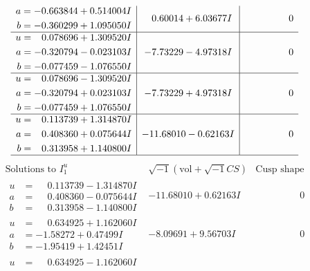 \documentclass[1p]{elsarticle_modified}
\theoremstyle{definition}
\newcommand{\I}{\sqrt{-1}}
\begin{document}
$$\begin{array}{c|c|c}
\begin{aligned}
a &= -0.663844 + 0.514004 I \\
b &= -0.360299 + 1.095050 I\end{aligned}
 & \phantom{-}0.60014 + 6.03677 I & \phantom{-0.000000 } 0 \\ \hline\begin{aligned}
u &= \phantom{-}0.078696 + 1.309520 I \\
a &= -0.320794 - 0.023103 I \\
b &= -0.077459 - 1.076550 I\end{aligned}
 & -7.73229 - 4.97318 I & \phantom{-0.000000 } 0 \\ \hline\begin{aligned}
u &= \phantom{-}0.078696 - 1.309520 I \\
a &= -0.320794 + 0.023103 I \\
b &= -0.077459 + 1.076550 I\end{aligned}
 & -7.73229 + 4.97318 I & \phantom{-0.000000 } 0 \\ \hline\begin{aligned}
u &= \phantom{-}0.113739 + 1.314870 I \\
a &= \phantom{-}0.408360 + 0.075644 I \\
b &= \phantom{-}0.313958 + 1.140800 I\end{aligned}
 & -11.68010 - 0.62163 I & \phantom{-0.000000 } 0\\
 \hline 
 \end{array}$$\newpage$$\begin{array}{c|c|c}  
\text{Solutions to }I^u_{1}& \I (\text{vol} + \sqrt{-1}CS) & \text{Cusp shape}\\
 \hline 
\begin{aligned}
u &= \phantom{-}0.113739 - 1.314870 I \\
a &= \phantom{-}0.408360 - 0.075644 I \\
b &= \phantom{-}0.313958 - 1.140800 I\end{aligned}
 & -11.68010 + 0.62163 I & \phantom{-0.000000 } 0 \\ \hline\begin{aligned}
u &= \phantom{-}0.634925 + 1.162060 I \\
a &= -1.58272 + 0.47499 I \\
b &= -1.95419 + 1.42451 I\end{aligned}
 & -8.09691 + 9.56703 I & \phantom{-0.000000 } 0 \\ \hline\begin{aligned}
u &= \phantom{-}0.634925 - 1.162060 I \\

\end{aligned}
\end{array}$$
\end{document}
